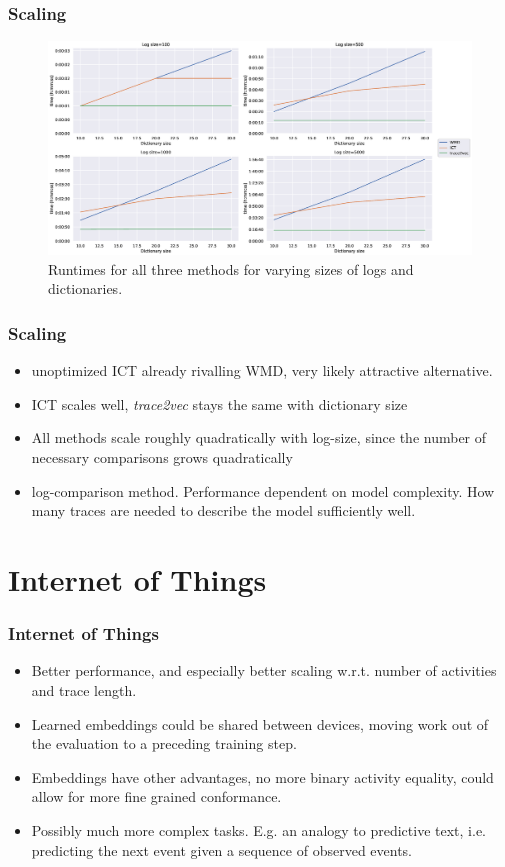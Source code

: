 \documentclass{beamer}
\begin{document}
	
	\begin{frame}
		\frametitle{Scaling}
		\begin{figure}
			\includegraphics[width=1\textwidth]{figures/scaling}
			\caption{Runtimes for all three methods for varying sizes of logs and dictionaries.}
			\label{fig:scalability}
		\end{figure}
	\end{frame}
	
	
	\begin{frame}
		\frametitle{Scaling}
		\begin{itemize}
			\item unoptimized ICT already rivalling WMD, very likely attractive alternative.
			\item ICT scales well, \emph{trace2vec} stays the same with dictionary size
			\item All methods scale roughly quadratically with log-size, since the number of necessary comparisons grows quadratically
			\item log-comparison method. Performance dependent on model complexity. How many traces are needed to describe the model sufficiently well.
		\end{itemize}
	\end{frame}
	
	\section{Internet of Things}
	\begin{frame}
		\frametitle{Internet of Things}
		\begin{itemize}
			\item Better performance, and especially better scaling w.r.t. number of activities and trace length.
			\item Learned embeddings could be shared between devices, moving work out of the evaluation to a preceding training step.
			\item Embeddings have other advantages, no more binary activity equality, could allow for more fine grained conformance.
			\item Possibly much more complex tasks. E.g. an analogy to predictive text, i.e. predicting the next event given a sequence of observed events.
		\end{itemize}
	\end{frame}
	
\end{document}
